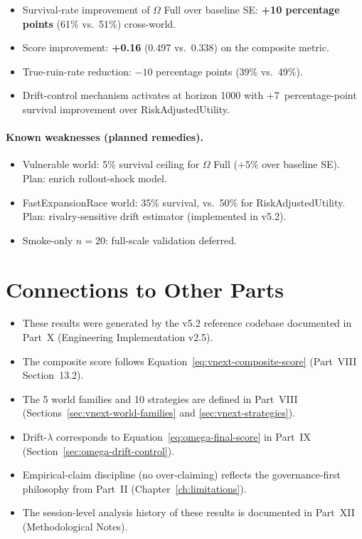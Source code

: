 \begin{itemize}
\item Survival-rate improvement of $\Omega$ Full over baseline SE:
\textbf{+10 percentage points} (61\% vs.~51\%) cross-world.
\item Score improvement: \textbf{+0.16} (0.497 vs.~0.338) on the
composite metric.
\item True-ruin-rate reduction: $-10$ percentage points (39\%
vs.~49\%).
\item Drift-control mechanism activates at horizon 1000 with
$+7$~percentage-point survival improvement over RiskAdjustedUtility.
\end{itemize}

\paragraph{Known weaknesses (planned remedies).}

\begin{itemize}
\item Vulnerable world: 5\% survival ceiling for $\Omega$ Full
($+5\%$ over baseline SE). Plan: enrich rollout-shock model.
\item FastExpansionRace world: 35\% survival, vs.~50\% for
RiskAdjustedUtility. Plan: rivalry-sensitive drift estimator
(implemented in v5.2).
\item Smoke-only $n = 20$: full-scale validation deferred.
\end{itemize}

\section*{Connections to Other Parts}

\begin{itemize}
\item These results were generated by the v5.2 reference codebase
documented in Part~X (Engineering Implementation v2.5).
\item The composite score follows
Equation~\ref{eq:vnext-composite-score} (Part~VIII Section~13.2).
\item The 5 world families and 10 strategies are defined in
Part~VIII (Sections~\ref{sec:vnext-world-families} and
\ref{sec:vnext-strategies}).
\item Drift-$\lambda$ corresponds to
Equation~\ref{eq:omega-final-score} in Part~IX
(Section~\ref{sec:omega-drift-control}).
\item Empirical-claim discipline (no over-claiming) reflects the
governance-first philosophy from Part~II
(Chapter~\ref{ch:limitations}).
\item The session-level analysis history of these results is
documented in Part~XII (Methodological Notes).
\end{itemize}
